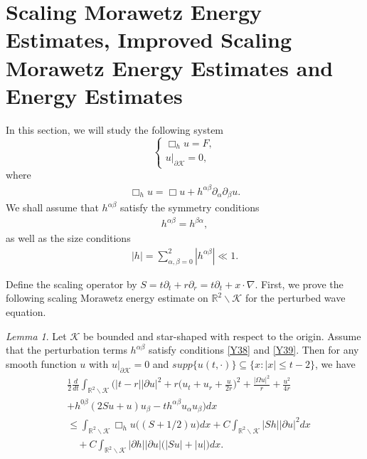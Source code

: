 \documentclass[11pt, reqno]{amsart}
\theoremstyle{definition}
\theoremstyle{remark}
\newtheorem{lem}[thm]{Lemma}
\theoremstyle{definition}
\numberwithin{equation}{section}
\numberwithin{equation}{section}
\def\leq{\leqslant}
\begin{document}
\section{Scaling Morawetz Energy Estimates, Improved Scaling Morawetz Energy Estimates and Energy Estimates}
In this section, we will study the following system
\begin{equation}\label{Y56}
\left \{
\begin{array}{lllll}
\Box_h u=F,\\
u|_{\partial\mathcal {K}}=0,
\end{array} \right.
\end{equation}
where
\begin{align*}
\Box_h u=\Box
u+h^{\alpha\beta}\partial_{\alpha}\partial_{\beta}u.
\end{align*}
We shall assume that $h^{\alpha\beta}$ satisfy the symmetry
conditions
\begin{align}\label{Y38}
h^{\alpha\beta}=h^{\beta\alpha},
\end{align}
as well as the size conditions
\begin{align}\label{Y39}
|h|=\sum_{\alpha,\beta=0}^2|h^{\alpha\beta}|\ll1.
\end{align}
\par Define the scaling operator by
$S=t\partial_t+r\partial_r=t\partial_t+x\cdot\nabla$. First, we
prove the following scaling Morawetz energy estimate on $\mathbb
R^2\backslash\mathcal {K}$ for the perturbed wave equation.
\begin{lem}\label{lem5}
Let $\mathcal {K}$ be bounded and star-shaped with respect to the origin.
Assume that the perturbation terms $h^{\alpha\beta}$ satisfy conditions \eqref{Y38} and \eqref{Y39}.
Then for any smooth function $u$ with $u|_{\partial\mathcal {K}}=0$ and $supp\{u(t,\cdot)\}\subseteq\{x:|x|\leq t-2\}$, we have
\begin{align}\label{Y29}
&\frac12\frac{d}{dt}\int_{\mathbb R^2\backslash\mathcal
{K}}\bigg(|t-r||\partial u|^2+r\Big(u_t+u_r+\frac
u{2r}\Big)^2+\frac{|\Omega
u|^2}r+\frac {u^2}{4r}\nonumber\\&+h^{0\beta}(2Su+u)u_{\beta}
-th^{\alpha\beta}u_{\alpha}u_{\beta}\bigg)dx
\nonumber\\&\leq\int_{\mathbb R^2\backslash\mathcal {K}}\Box_h u
\big((S+1/2)u\big)dx+C\int_{\mathbb R^2\backslash\mathcal {K}}|Sh||\partial u|^2dx
\nonumber\\&\quad+C\int_{\mathbb R^2\backslash\mathcal {K}}|\partial h||\partial u|\big(|Su|+|u|\big)dx.
\end{align}
\end{lem}
\end{document}
